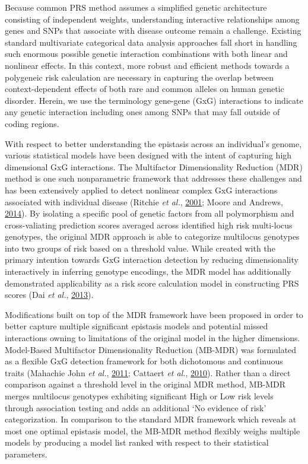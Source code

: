 \documentclass{ws-procs11x85}
\begin{document}
Because common PRS method assumes a simplified genetic architecture
consisting of independent weights, understanding interactive
relationships among genes and SNPs that associate with disease outcome
remain a challenge. Existing standard multivariate categorical data
analysis approaches fall short in handling such enormous possible
genetic interaction combinations with both linear and nonlinear effects.
In this context, more robust and efficient methods towards a polygeneic
risk calculation are necessary in capturing the overlap between
context-dependent effects of both rare and common alleles on human
genetic disorder. Herein, we use the terminology gene-gene (GxG)
interactions to indicate any genetic interaction including ones among
SNPs that may fall outside of coding regions.

With respect to better understanding the epistasis across an
individual's genome, various statistical models have been designed with
the intent of capturing high dimensional GxG interactions. The
Multifactor Dimensionality Reduction (MDR) method is one such
nonparametric framework that addresses these challenges and has been
extensively applied to detect nonlinear complex GxG interactions
associated with individual disease (Ritchie \emph{et al.},
\protect\hyperlink{ref-E26QhGxD}{2001}; Moore and Andrews,
\protect\hyperlink{ref-1BqLrlGsj}{2014}). By isolating a specific pool
of genetic factors from all polymorphism and cross-valiating prediction
scores averaged across identified high risk multi-locus genotypes, the
original MDR approach is able to categorize multilocus genotypes into
two groups of risk based on a threshold value. While created with the
primary intention towards GxG interaction detection by reducing
dimensionality interactively in inferring genotype encodings, the MDR
model has additionally demonstrated applicability as a risk score
calculation model in constructing PRS scores (Dai \emph{et al.},
\protect\hyperlink{ref-93PfLXPZ}{2013}).

Modifications built on top of the MDR framework have been proposed in
order to better capture multiple significant epistasis models and
potential missed interactions owning to limitations of the original
model in the higher dimensions. Model-Based Multifactor Dimensionality
Reduction (MB-MDR) was formulated as a flexible GxG detection framework
for both dichotomous and continuous traits (Mahachie John \emph{et al.},
\protect\hyperlink{ref-kN4MaLuT}{2011}; Cattaert \emph{et al.},
\protect\hyperlink{ref-16AnEAMje}{2010}). Rather than a direct
comparison against a threshold level in the original MDR method, MB-MDR
merges multilocus genotypes exhibiting significant High or Low risk
levels through association testing and adds an additional `No evidence
of risk' categorization. In comparison to the standard MDR framework
which reveals at most one optimal epistasis model, the MB-MDR method
flexibly weighs multiple models by producing a model list ranked with
respect to their statistical parameters.
\end{document}
